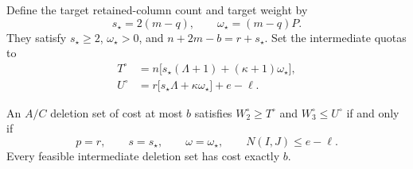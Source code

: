 Define the target retained-column count and target weight by
\[
 s_\star=2(m-q),\qquad \omega_\star=(m-q)P.
\]
They satisfy \(s_\star\ge2\), \(\omega_\star>0\), and
\(n+2m-b=r+s_\star\). Set the intermediate quotas to
\begin{equation}
\label{hard:intermediate-quotas}
\begin{aligned}
 T^\circ
   &=n\bigl[s_\star(\Lambda+1)+(\kappa+1)\omega_\star\bigr],\\
 U^\circ
   &=r\bigl[s_\star\Lambda+\kappa\omega_\star\bigr]+e-\ell.
\end{aligned}
\end{equation}

\begin{lemma}
\label{hard:allocation}
An \(A/C\) deletion set of cost at most \(b\) satisfies
\(W_2^\circ\ge T^\circ\) and \(W_3^\circ\le U^\circ\) if and only if
\begin{equation}
\label{hard:forced-values}
 p=r,\qquad s=s_\star,\qquad \omega=\omega_\star,\qquad
 N(I,J)\le e-\ell.
\end{equation}
Every feasible intermediate deletion set has cost exactly \(b\).
\end{lemma}

